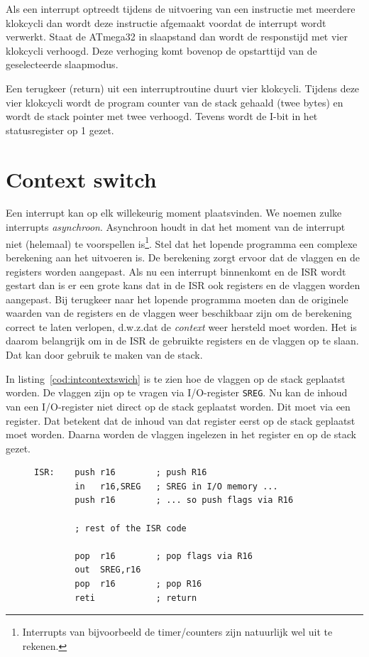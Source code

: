 Als een interrupt optreedt tijdens de uitvoering van een instructie met
meerdere klokcycli dan wordt deze instructie afgemaakt voordat de interrupt
wordt verwerkt. Staat de ATmega32 in slaapstand dan wordt de responstijd met
vier klokcycli verhoogd. Deze verhoging komt bovenop de opstarttijd van de
geselecteerde slaapmodus.

Een terugkeer (return) uit een interruptroutine duurt vier klokcycli. Tijdens
deze vier klokcycli wordt de program counter van de stack gehaald (twee bytes)
en wordt de stack pointer met twee verhoogd. Tevens wordt de I-bit in het
statusregister op 1 gezet.

\section{Context switch}
Een interrupt kan op elk willekeurig moment plaatsvinden. We noemen zulke
interrupts \textsl{asynchroon}. Asynchroon houdt in dat het moment van
de interrupt niet (helemaal) te voorspellen is\footnote{Interrupts van
bijvoorbeeld de timer/counters zijn natuurlijk wel uit te rekenen.}. Stel
dat het lopende programma een complexe berekening aan het uitvoeren is.
De berekening zorgt ervoor dat de vlaggen en de registers worden aangepast.
Als nu een interrupt binnenkomt en de ISR wordt gestart dan is er een
grote kans dat in de ISR ook registers en de vlaggen worden aangepast.
Bij terugkeer naar het lopende programma moeten dan de originele waarden
van de registers en de vlaggen weer beschikbaar zijn om de berekening
correct te laten verlopen, d.w.z.\@ dat de \textsl{context} weer hersteld
moet worden. Het is daarom belangrijk om in de ISR de gebruikte registers
en de vlaggen op te slaan. Dat kan door gebruik te maken van de stack. 

In listing~\ref{cod:intcontextswich} is te zien hoe de vlaggen op de stack
geplaatst worden. De vlaggen zijn op te vragen via I/O-register
\lstinline|SREG|. Nu kan de inhoud van een I/O-register niet direct op de
stack geplaatst worden. Dit moet via een register. Dat betekent dat de inhoud
van dat register eerst op de stack geplaatst moet worden. Daarna worden de
vlaggen ingelezen in het register en op de stack gezet.

\begin{figure}[!ht]
\begin{lstlisting}[language=AVRassembler,caption=Opslaan van de registers en vlaggen.,label=cod:intcontextswich]
ISR:	push r16		; push R16
		in   r16,SREG	; SREG in I/O memory ...
		push r16		; ... so push flags via R16
		
		; rest of the ISR code

		pop  r16		; pop flags via R16
		out  SREG,r16
		pop  r16		; pop R16
		reti			; return
\end{lstlisting}
\end{figure}

